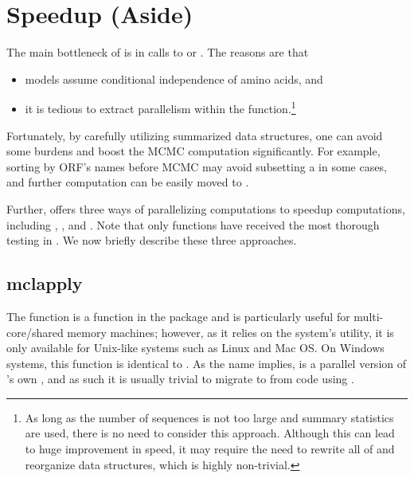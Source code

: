 
\section[Speedup (Aside)]{Speedup (Aside)}
\label{sec:speedup}

The main bottleneck of  is in calls to  or
. The reasons are that
\begin{itemize}
\item models assume conditional independence of amino acids, and
\item it is tedious to extract parallelism within the 
 function.\footnote{
As long as the number of sequences is not too large and summary statistics are
used, there is no need to consider this approach. Although this can lead to
huge improvement in speed, it may require the need to rewrite all of
 and reorganize data structures, which is highly non-trivial.
}
\end{itemize}
Fortunately, by carefully utilizing summarized data structures, one can avoid 
some burdens and boost the MCMC computation significantly. For example, 
sorting by ORF's names before MCMC may avoid subsetting a  in 
some cases, and further computation can be easily moved to .

Further,  offers three ways of parallelizing computations to
speedup computations, including
, , and
. Note that only  functions have
received the most thorough testing in .  We now briefly describe 
these three approaches.


\subsection[mclapply]{mclapply}
\label{sec:mclapply}

The function 
is a function in the  package and is particularly useful for
multi-core/shared memory machines; however, as it relies on the system's 
 utility, it is only available for Unix-like systems such
as Linux and Mac OS.
On Windows systems, this function is identical to .
As the name implies,  is a parallel version of 's 
own , and as such it is usually trivial to migrate to 
 from code using .

